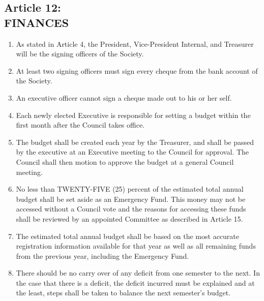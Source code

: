 \documentclass[]{report}
\begin{document}
\clearpage
\begin{center}
	\section*{Article 12:\\FINANCES}
	\vspace{12px}
\end{center}
\label{finances}

	\renewcommand{\theenumi}{\Alph{enumi}}
	\begin{enumerate}
	
		\item As stated in Article 4, the President, Vice-President Internal, and Treasurer will be the signing officers of the Society.
		
		\item At least two signing officers must sign every cheque from the bank account of the Society.
		
		\item An executive officer cannot sign a cheque made out to his or her self.
		
		\item Each newly elected Executive is responsible for setting a budget within the first month after the Council takes office.
		
		\item The budget shall be created each year by the Treasurer, and shall be passed by the executive at an Executive meeting to the Council for approval. The Council shall then motion to approve the budget at a general Council meeting.
		
		\item No less than TWENTY-FIVE (25) percent of the estimated total annual budget shall be set aside as an Emergency Fund. This money may not be accessed without a Council vote and the reasons for accessing these funds shall be reviewed by an appointed Committee as described in Article 15.
		
		\item The estimated total annual budget shall be based on the most accurate registration information available for that year as well as all remaining funds from the previous year, including the Emergency Fund.
		
		\item There should be no carry over of any deficit from one semester to the next. In the case that there is a deficit, the deficit incurred must be explained and at the least, steps shall be taken to balance the next semester's budget.
		

\end{enumerate}
\end{document}
